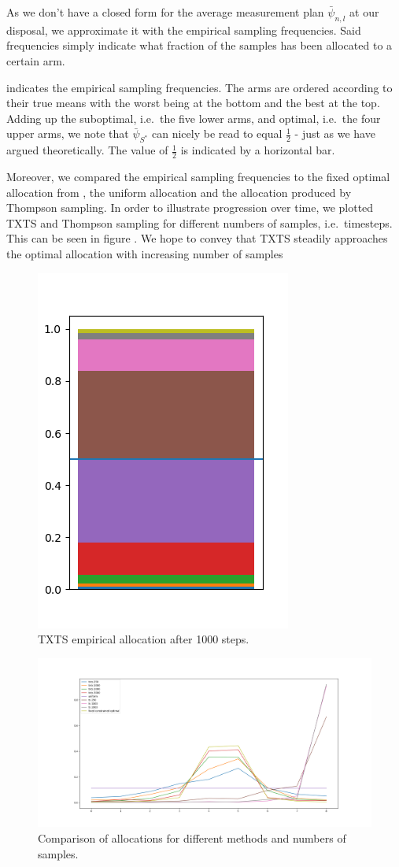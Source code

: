As we don't have a closed form for the average measurement plan
$\bar{\psi}_{n,l}$ at our disposal, we approximate it with the empirical
sampling frequencies. Said frequencies simply indicate what fraction of the
samples has been allocated to a certain arm.

 indicates the empirical sampling frequencies. The
arms are ordered according to their true means with the worst being at the
bottom and the best at the top. Adding up the suboptimal, i.e.\ the five lower
arms, and optimal, i.e.\ the four upper arms, we note that $\bar{\psi}_{S^*}$ can
nicely be read to equal $\frac{1}{2}$ - just as we have argued theoretically.
The value of $\frac{1}{2}$ is indicated by a horizontal bar.

Moreover, we compared the empirical sampling frequencies to the fixed optimal
allocation from , the uniform
allocation and the allocation produced by Thompson sampling. In order to
illustrate progression over time, we plotted TXTS and Thompson sampling for
different numbers of samples, i.e.\ timesteps. This can be seen in figure
. We hope to convey that TXTS steadily
approaches the optimal allocation with increasing number of samples
\begin{figure}[h]
  \centering
  \includegraphics[width=.25\textwidth]{190723-selections_2.png}
  \caption{TXTS empirical allocation after 1000 steps.}
  \label{fig:measurement_plan}
\end{figure}
\begin{figure}[h]
  \centering
  \includegraphics[width=\textwidth]{191112-selection.png}
  \caption{Comparison of allocations for different methods and numbers of
      samples.}
  \label{fig:measurement_plan_comparison}
\end{figure}

